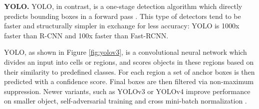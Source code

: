 \textbf{YOLO.}
YOLO, in contrast, is a one-stage detection algorithm which directly predicts bounding boxes in a forward pass \cite{visoai2021detection}. This type of detectors tend to be faster and structurally simpler in exchange for less accuracy: YOLO is 1000x faster than R-CNN and 100x faster than Fast-RCNN. 


YOLO, as shown in Figure \ref{fig:yolov3}, is a convolutional neural network which divides an input into cells or regions, and scores objects in these regions based on their similarity to predefined classes. For each region a set of anchor boxes is then predicted with a confidence score. Final boxes are then filtered via non-maximum suppression. Newer variants, such as YOLOv3 or YOLOv4 improve performance on smaller object, self-adversarial training and cross mini-batch normalization \cite{visoai2021detection}.






